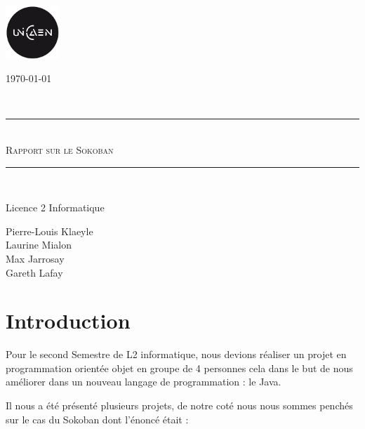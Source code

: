 \documentclass[a4paper,12pt]{article} %
\newcommand{\HRule}{\rule{\linewidth}{0.5mm}}
\begin{document}
\begin{titlepage}

\includegraphics[width = 20mm]{logo.png} \hfill
\begin{minipage}{0.4\textwidth}
\begin{flushright} \large
\today
\end{flushright}
\end{minipage}
\textsc{}\\[4cm]
\begin{center}

\HRule \\[2cm]

\textsc{\Large Rapport sur le Sokoban}\\[1.5cm]
\HRule \\[2cm]
\vspace{6cm}
\end{center}
 \begin{minipage}{0.4\textwidth}
      \begin{flushleft} \large
        Licence 2 Informatique
      \end{flushleft}
    \end{minipage}
    \begin{minipage}{0.6\textwidth}
      \begin{flushright} \large
       Pierre-Louis Klaeyle\\
       Laurine Mialon\\
       Max Jarrosay\\
       Gareth Lafay\\
      \end{flushright}
    \end{minipage}
\end{titlepage}
\tableofcontents
\newpage
\section*{Introduction}

Pour le second Semestre de L2 informatique, nous devions réaliser un projet en programmation orientée objet en groupe de 4 personnes cela dans le but de nous améliorer dans un nouveau langage de programmation : le Java.

Il nous a été présenté plusieurs projets, de notre coté nous nous sommes penchés sur le cas du Sokoban dont l’énoncé était :
\end{document}
